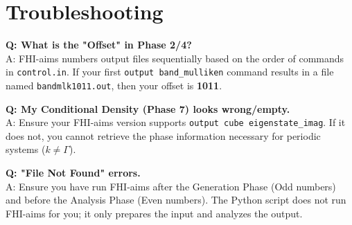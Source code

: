 \documentclass[a4paper,11pt]{article}
\begin{document}
\newpage

\section{Troubleshooting}

\textbf{Q: What is the "Offset" in Phase 2/4?} \\
A: FHI-aims numbers output files sequentially based on the order of commands in \texttt{control.in}. If your first \texttt{output band\_mulliken} command results in a file named \texttt{bandmlk1011.out}, then your offset is \textbf{1011}.

\textbf{Q: My Conditional Density (Phase 7) looks wrong/empty.} \\
A: Ensure your FHI-aims version supports \texttt{output cube eigenstate\_imag}. If it does not, you cannot retrieve the phase information necessary for periodic systems ($k \neq \Gamma$).

\textbf{Q: "File Not Found" errors.} \\
A: Ensure you have run FHI-aims after the Generation Phase (Odd numbers) and before the Analysis Phase (Even numbers). The Python script does not run FHI-aims for you; it only prepares the input and analyzes the output.
\end{document}
